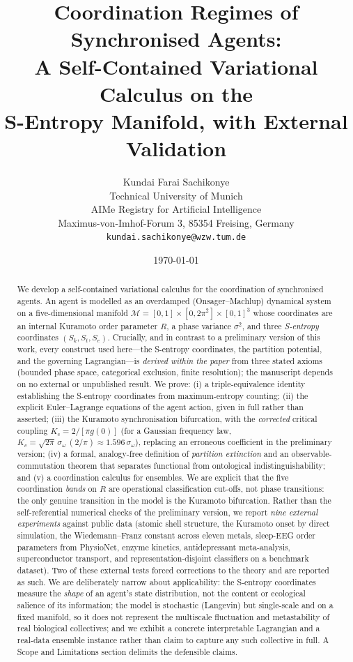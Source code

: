 \documentclass[11pt,twocolumn,a4paper]{article}
\title{\textbf{Coordination Regimes of Synchronised Agents:\\
A Self-Contained Variational Calculus on the\\
S-Entropy Manifold, with External Validation}}
\author{Kundai Farai Sachikonye\\
Technical University of Munich\\
AIMe Registry for Artificial Intelligence\\
Maximus-von-Imhof-Forum 3, 85354 Freising, Germany\\
\texttt{kundai.sachikonye@wzw.tum.de}}
\date{\today}
\newcommand{\M}{\mathcal{M}}
\newcommand{\Sk}{S_k}
\newcommand{\St}{S_t}
\newcommand{\Se}{S_e}
\newcommand{\Kc}{K_c}
\newcommand{\Ord}{R}
\begin{document}
\maketitle

\begin{abstract}
We develop a self-contained variational calculus for the coordination of
synchronised agents. An agent is modelled as an overdamped (Onsager--Machlup)
dynamical system on a five-dimensional manifold
$\M=[0,1]\times[0,2\pi^2]\times[0,1]^3$ whose coordinates are an internal
Kuramoto order parameter $\Ord$, a phase variance $\sigma^2$, and three
\emph{S-entropy} coordinates $(\Sk,\St,\Se)$. Crucially, and in contrast to a
preliminary version of this work, every construct used here---the S-entropy
coordinates, the partition potential, and the
governing Lagrangian---is \emph{derived within the paper} from three stated
axioms (bounded phase space, categorical exclusion, finite resolution); the
manuscript depends on no external or unpublished result. We prove: (i) a
triple-equivalence identity establishing the S-entropy coordinates from
maximum-entropy counting; (ii) the explicit Euler--Lagrange equations of the
agent action, given in full rather than asserted; (iii) the Kuramoto
synchronisation bifurcation, with the \emph{corrected} critical coupling
$\Kc=2/[\pi g(0)]$ (for a Gaussian frequency law, $\Kc=\sqrt{2\pi}\,\sigma_\omega
\,(2/\pi)\approx 1.596\,\sigma_\omega$), replacing an erroneous coefficient in
the preliminary version; (iv) a formal, analogy-free definition of
\emph{partition extinction} and an observable-commutation theorem that
separates functional from ontological indistinguishability; and (v) a
coordination calculus for ensembles. We are explicit that the five coordination
\emph{bands} on $\Ord$ are operational classification cut-offs, not
phase transitions: the only genuine transition in the model is the Kuramoto
bifurcation. Rather than the self-referential numerical checks of the
preliminary version, we report \emph{nine external experiments} against public
data (atomic shell structure, the Kuramoto onset by direct simulation, the
Wiedemann--Franz constant across eleven metals, sleep-EEG order parameters from
PhysioNet, enzyme kinetics, antidepressant meta-analysis, superconductor
transport, and representation-disjoint classifiers on a benchmark dataset).
Two of these external tests forced corrections to the theory and are reported
as such. We are deliberately narrow about applicability: the S-entropy
coordinates measure the \emph{shape} of an agent's state distribution, not the
content or ecological salience of its information; the model is stochastic
(Langevin) but single-scale and on a fixed manifold, so it does not represent the
multiscale fluctuation and metastability of real biological collectives; and we
exhibit a concrete interpretable Lagrangian and a real-data ensemble instance
rather than claim to capture any such collective in full. A Scope and Limitations
section delimits the defensible claims.
\end{abstract}
\end{document}

